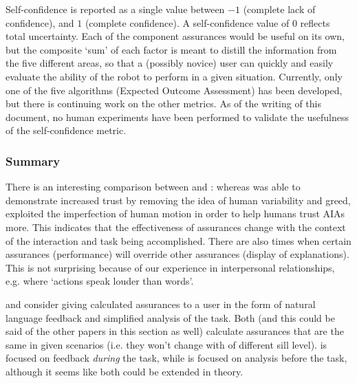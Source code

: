 Self-confidence is reported as a single value between $-1$ (complete lack of confidence), and $1$ (complete confidence). A self-confidence value of $0$ reflects total uncertainty. Each of the component assurances would be useful on its own, but the composite `sum' of each factor is meant to distill the information from the five different areas, so that a (possibly novice) user can quickly and easily evaluate the ability of the robot to perform in a given situation. Currently, only one of the five algorithms (Expected Outcome Assessment) has been developed, but there is continuing work on the other metrics. As of the writing of this document, no human experiments have been performed to validate the usefulness of the self-confidence metric. 

\subsubsection{Summary}
There is an interesting comparison between \cite{Wu2016-ei} and \cite{Dragan2013-wd}: whereas \cite{Wu2016-ei} was able to demonstrate increased trust by removing the idea of human variability and greed, \cite{Dragan2013-wd} exploited the imperfection of human motion in order to help humans trust AIAs more. This indicates that the effectiveness of assurances change with the context of the interaction and task being accomplished. There are also times when certain assurances (performance) will override other assurances (display of explanations). This is not surprising because of our experience in interpersonal relationships, e.g. where `actions speak louder than words'. 

\citeauthor{Wang2016-id} and \citeauthor{Aitken2016-fb} consider giving calculated assurances to a user in the form of natural language feedback and simplified analysis of the task. Both (and this could be said of the other papers in this section as well) calculate assurances that are the same in given scenarios (i.e. they won't change with of different sill level). \citet{Wang2016-id} is focused on feedback \emph{during} the task, while \citet{Aitken2016-fb} is focused on analysis before the task, although it seems like both could be extended in theory.
